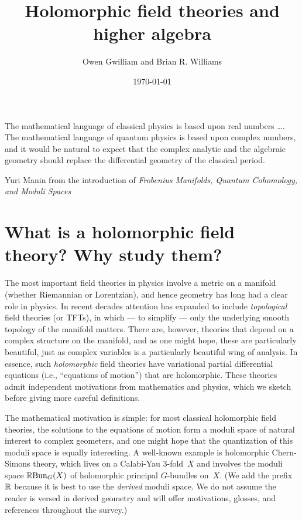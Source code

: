 \documentclass[11pt]{amsart}
\author{Owen Gwilliam and Brian R. Williams}
\date{\today}
\title{Holomorphic field theories and higher algebra}
\begin{document}

\maketitle

\epigraph{The mathematical language of classical physics is based upon real numbers \dots. The mathematical language of quantum physics is based upon complex numbers, and it would be natural to expect that the complex analytic and the algebraic geometry should replace the differential geometry of the classical period.}{Yuri Manin from the introduction of {\it Frobenius Manifolds, Quantum Cohomology, and Moduli Spaces}}

\tableofcontents


\section{What is a holomorphic field theory? Why study them?}


The most important field theories in physics involve a metric on a manifold (whether Riemannian or Lorentzian), and hence geometry has long had a clear role in physics.
In recent decades attention has expanded to include {\em topological} field theories (or TFTs), 
in which --- to simplify --- only the underlying smooth topology of the manifold matters.
There are, however, theories that depend on a complex structure on the manifold,
and as one might hope, these are particularly beautiful, 
just as complex variables is a particularly beautiful wing of analysis.
In essence, such {\em holomorphic} field theories have variational partial differential equations (i.e., ``equations of motion'') that are holomorphic.
These theories admit independent motivations from mathematics and physics,
which we sketch before giving more careful definitions.

The mathematical motivation is simple:
for most classical holomorphic field theories, the solutions to the equations of motion form a moduli space of natural interest to complex geometers,
and one might hope that the quantization of this moduli space is equally interesting.
A well-known example is holomorphic Chern-Simons theory,
which lives on a Calabi-Yau 3-fold~$X$ and involves the moduli space $\mathbb R{\rm Bun}_G(X)$ of holomorphic principal $G$-bundles on~$X$.
(We add the prefix $\mathbb R$ because it is best to use the {\em derived} moduli space.
We do not assume the reader is versed in derived geometry and will offer motivations, glosses, and references throughout the survey.)
\end{document}
